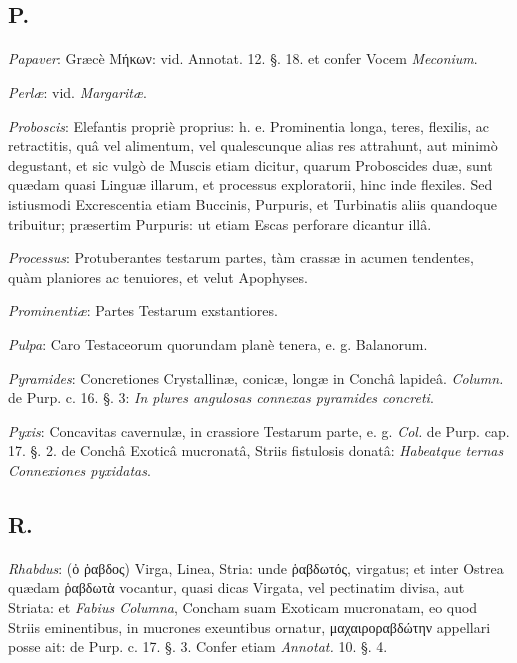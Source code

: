 \documentclass[a4paper, 11pt, oneside, polutonikogreek, german]{article}
\begin{document}
\subsection{P.}
\paragraph{}
\emph{Papaver}: Græcè Μήκων: vid. Annotat. 12. §. 18. et confer Vocem \emph{Meconium}.

\emph{Perlæ}: vid. \emph{Margaritæ}.

\emph{Proboscis}: Elefantis propriè proprius: h. e. Prominentia longa, teres, flexilis, ac retractitis, quâ vel alimentum, vel qualescunque alias res attrahunt, aut minimò degustant, et sic vulgò de Muscis etiam dicitur, quarum Proboscides duæ, sunt quædam quasi Linguæ illarum, et processus exploratorii, hinc inde flexiles. Sed istiusmodi Excrescentia etiam Buccinis, Purpuris, et Turbinatis aliis quandoque tribuitur; præsertim Purpuris: ut etiam Escas perforare dicantur illâ.

\emph{Processus}: Protuberantes testarum partes, tàm crassæ in acumen tendentes, quàm planiores ac tenuiores, et velut Apophyses.

\emph{Prominentiæ}: Partes Testarum exstantiores.

\emph{Pulpa}: Caro Testaceorum quorundam planè tenera, e. g. Balanorum.

\emph{Pyramides}: Concretiones Crystallinæ, conicæ, longæ in Conchâ lapideâ. \emph{Column.} de Purp. c. 16. §. 3: \emph{In plures angulosas connexas pyramides concreti}.

\emph{Pyxis}: Concavitas cavernulæ, in crassiore Testarum parte, e. g. \emph{Col.} de Purp. cap. 17. §. 2. de Conchâ Exoticâ mucronatâ, Striis fistulosis donatâ: \emph{Habeatque ternas Connexiones pyxidatas}.

\subsection{R.}
\paragraph{}
\emph{Rhabdus}: (ὀ ῥαβδος) Virga, Linea, Stria: unde ῥαβδωτός, virgatus; et inter Ostrea quædam ῥαβδωτὰ vocantur, quasi dicas Virgata, vel pectinatim divisa, aut Striata: et \emph{Fabius Columna}, Concham suam Exoticam mucronatam, eo quod Striis eminentibus, in mucrones exeuntibus ornatur, μαχαιροραβδώτην appellari posse ait: de Purp. c. 17. §. 3. Confer etiam \emph{Annotat.} 10. §. 4.
\end{document}
